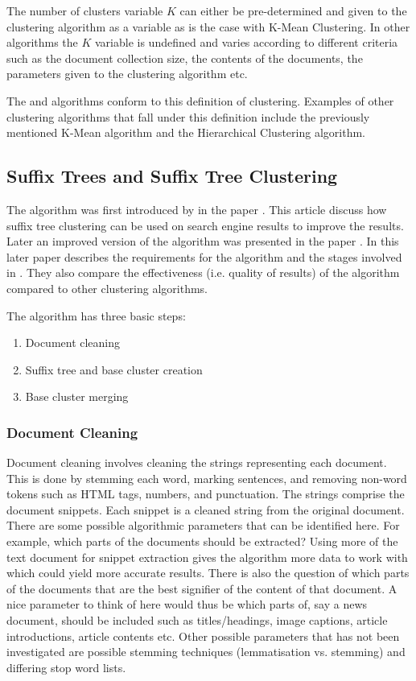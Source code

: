 The number of clusters variable \(K\) can either be pre-determined and given to the clustering algorithm as a variable as is the case with K-Mean Clustering. In other algorithms the \(K\) variable is undefined and varies according to different criteria such as the document collection size, the contents of the documents, the parameters given to the clustering algorithm etc.

The \STC and \CTC algorithms conform to this definition of clustering. Examples of other clustering algorithms that fall under this definition include the previously mentioned K-Mean algorithm and the Hierarchical Clustering algorithm.

\subsection{Suffix Trees and Suffix Tree Clustering}
The \STC algorithm was first introduced by \textcite{Oren1997} in the paper . This article discuss how suffix tree clustering can be used on search engine results to improve the results. Later an improved version of the algorithm was presented in the paper  \cite{Oren1998}. In this later paper \citeauthor{Oren1998} describes the requirements for the \STC algorithm and the stages involved in \STC. They also compare the effectiveness (i.e. quality of results) of the algorithm compared to other clustering algorithms.

The \STC algorithm has three basic steps:
\begin{enumerate}
\item Document cleaning
\item Suffix tree and base cluster creation
\item Base cluster merging
\end{enumerate}

\subsubsection{Document Cleaning}

Document cleaning involves cleaning the strings representing each document. This is done by stemming each word, marking sentences, and removing non-word tokens such as HTML tags, numbers, and punctuation. The strings comprise the document snippets. Each snippet is a cleaned string from the original document. There are some possible algorithmic parameters that can be identified here. For example, which parts of the documents should be extracted? Using more of the text document for snippet extraction gives the algorithm more data to work with which could yield more accurate results. There is also the question of which parts of the documents that are the best signifier of the content of that document. A nice parameter to think of here would thus be which parts of, say a news document, should be included such as titles/headings, image captions, article introductions, article contents etc. Other possible parameters that has not been investigated are possible stemming techniques (lemmatisation vs. stemming) and differing stop word lists.

